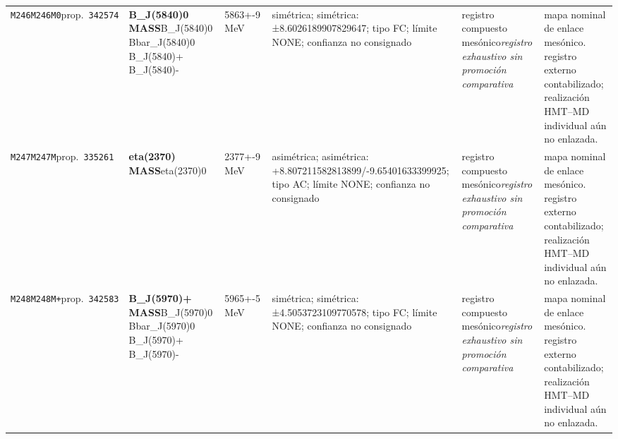 \begin{landscape}
\begin{longtable}{L{1.85cm}L{4.45cm}L{2.35cm}L{4.05cm}L{3.35cm}L{7.15cm}}
\texttt{M246}\newline \texttt{M246M0}\newline prop.\ \texttt{342574} & \textbf{B\_\allowbreak{}J(5840)0 MASS}\newline B\_\allowbreak{}J(5840)0 \textbar{}\allowbreak{} Bbar\_\allowbreak{}J(5840)0 \textbar{}\allowbreak{} B\_\allowbreak{}J(5840)+ \textbar{}\allowbreak{} B\_\allowbreak{}J(5840)- & 5863+-9\,MeV & simétrica; simétrica: ±8.6026189907829647; tipo FC; límite NONE; confianza no consignado & registro compuesto mesónico\newline \emph{registro exhaustivo sin promoción comparativa} & mapa nominal de enlace mesónico. registro externo contabilizado; realización HMT--MD individual aún no enlazada. \\
\texttt{M247}\newline \texttt{M247M}\newline prop.\ \texttt{335261} & \textbf{eta(2370) MASS}\newline eta(2370)0 & 2377+-9\,MeV & asimétrica; asimétrica: +8.807211582813899/-9.65401633399925; tipo AC; límite NONE; confianza no consignado & registro compuesto mesónico\newline \emph{registro exhaustivo sin promoción comparativa} & mapa nominal de enlace mesónico. registro externo contabilizado; realización HMT--MD individual aún no enlazada. \\
\texttt{M248}\newline \texttt{M248M+}\newline prop.\ \texttt{342583} & \textbf{B\_\allowbreak{}J(5970)+ MASS}\newline B\_\allowbreak{}J(5970)0 \textbar{}\allowbreak{} Bbar\_\allowbreak{}J(5970)0 \textbar{}\allowbreak{} B\_\allowbreak{}J(5970)+ \textbar{}\allowbreak{} B\_\allowbreak{}J(5970)- & 5965+-5\,MeV & simétrica; simétrica: ±4.5053723109770578; tipo FC; límite NONE; confianza no consignado & registro compuesto mesónico\newline \emph{registro exhaustivo sin promoción comparativa} & mapa nominal de enlace mesónico. registro externo contabilizado; realización HMT--MD individual aún no enlazada. \\

\end{longtable}
\end{landscape}
